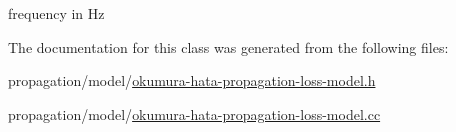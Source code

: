 frequency in Hz 



The documentation for this class was generated from the following files\+:\begin{DoxyCompactItemize}
\item 
propagation/model/\hyperlink{okumura-hata-propagation-loss-model_8h}{okumura-\/hata-\/propagation-\/loss-\/model.\+h}\item 
propagation/model/\hyperlink{okumura-hata-propagation-loss-model_8cc}{okumura-\/hata-\/propagation-\/loss-\/model.\+cc}\end{DoxyCompactItemize}
